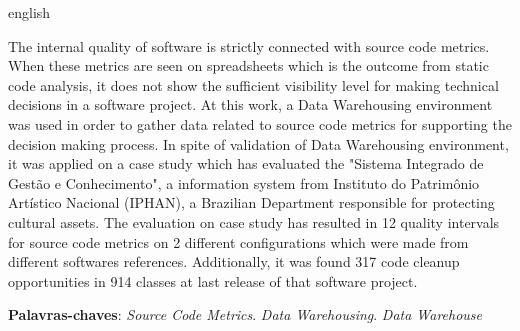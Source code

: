 \begin{resumo}[Abstract]
 \begin{otherlanguage*}{english}

 		The internal quality of software is strictly connected with source code metrics. When these metrics are seen on spreadsheets which is the outcome from static code analysis, it does not show the sufficient visibility level for making technical decisions in a software project. At this work, a Data Warehousing environment was used in order to gather data related to source code metrics for supporting the decision making process. In spite of validation of Data Warehousing environment, it was applied on a case study which has evaluated the "Sistema Integrado de Gestão e Conhecimento", a information system from Instituto do Patrimônio Artístico Nacional (IPHAN), a Brazilian Department responsible for protecting cultural assets. The evaluation on case study has resulted in 12 quality intervals for source code metrics on 2 different configurations which were made from different softwares references. Additionally, it was found 317 code cleanup opportunities in 914 classes at last release of that software project.

   \vspace{\onelineskip}
 
   \noindent 
    \textbf{Palavras-chaves}: \textit{Source Code Metrics}. \textit{Data Warehousing}. \textit{Data Warehouse}
 \end{otherlanguage*}
\end{resumo}
